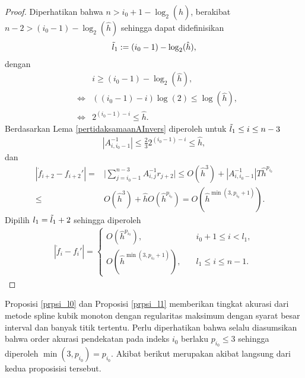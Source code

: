 \begin{proof}
    Diperhatikan bahwa $n > i_0 + 1 - \log_2(\hat{h})$, berakibat $n-2 > (i_0 - 1) - \log_2(\hat{h})$ sehingga dapat didefinisikan
    \begin{align*}
        \Tilde{l}_1 :=(i_0 - 1) - \log_2(\hat{h}),
    \end{align*}
    dengan
    \begin{align*}
        && i \geq (i_0 - 1) - \log_2(\hat{h}),\\
        &\Leftrightarrow&((i_0-1) - i)\log(2) \leq \log(\hat{h}),\\
        &\Leftrightarrow&2^{(i_0-1) - i} \leq \hat{h}.
    \end{align*}
    Berdasarkan Lema \ref{pertidaksamaanAInvers} diperoleh untuk $\Tilde{l}_1 \leq i \leq n-3$
    \begin{align*}
        |A_{i,{i_0-1}}^{-1}| \leq \frac{2}{3}2^{(i_0 - 1) - i} \leq \hat{h},
    \end{align*}
    dan 
    \begin{align*}
        |\dot{f}_{i+2} - f_{i+2}'| =& \Bigg| \sum_{j=i_0-1}^{n - 3} A_{i,j}^{-1}r_{j+2} \Bigg| \leq O(\hat{h}^3) + |A_{i,{i_0-1}}^{-1}|T\hat{h}^{p_{i_0}} \\
        \leq& O(\hat{h}^3) + \hat{h}O(\hat{h}^{p_{i_0}}) = O(\hat{h}^{\min(3,p_{i_0}+1)}).
    \end{align*}
    Dipilih $l_1 = \Tilde{l}_1 + 2$ sehingga diperoleh
    \begin{align*}
    |\dot{f}_i-f_i'|=
        \begin{cases}
        O(\hat{h}^{p_{i_0}}), &i_0 + 1 \leq i< l_1,\\
        O(\hat{h}^{\min(3,p_{i_0}+1)}), \quad &l_1 \leq i\leq n-1.
        \end{cases}
\end{align*}
\end{proof}

 Proposisi \ref{prpsi_l0} dan Proposisi \ref{prpsi_l1}  memberikan tingkat akurasi dari metode spline kubik monoton dengan regularitas maksimum dengan syarat besar interval dan banyak titik tertentu. Perlu diperhatikan bahwa selalu diasumsikan bahwa order akurasi pendekatan pada indeks $i_0$ berlaku $p_{i_0} \leq 3$ sehingga diperoleh $\min(3, p_{i_0}) = p_{i_0}$. Akibat berikut merupakan akibat langsung dari kedua proposisisi tersebut. 

